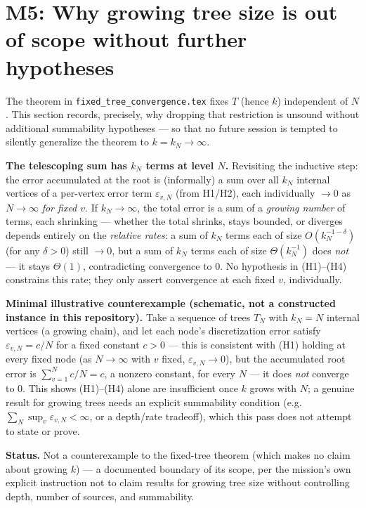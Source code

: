\section*{M5: Why growing tree size is out of scope without further hypotheses}

The theorem in \texttt{fixed\_tree\_convergence.tex} fixes $T$ (hence
$k$) independent of $N$. This section records, precisely, why dropping
that restriction is unsound without additional summability hypotheses —
so that no future session is tempted to silently generalize the theorem
to $k=k_N\to\infty$.

\textbf{The telescoping sum has $k_N$ terms at level $N$.} Revisiting the
inductive step: the error accumulated at the root is (informally) a sum
over all $k_N$ internal vertices of a per-vertex error term
$\varepsilon_{v,N}$ (from H1/H2), each individually $\to 0$ as $N\to
\infty$ \emph{for fixed $v$}. If $k_N\to\infty$, the total error is a sum
of a \emph{growing number} of terms, each shrinking — whether the total
shrinks, stays bounded, or diverges depends entirely on the
\emph{relative rates}: a sum of $k_N$ terms each of size
$O(k_N^{-1-\delta})$ (for any $\delta>0$) still $\to 0$, but a sum of
$k_N$ terms each of size $\Theta(k_N^{-1})$ does \emph{not} — it stays
$\Theta(1)$, contradicting convergence to $0$. No hypothesis in
(H1)–(H4) constrains this rate; they only assert convergence at each
fixed $v$, individually.

\textbf{Minimal illustrative counterexample (schematic, not a
constructed instance in this repository).} Take a sequence of trees
$T_N$ with $k_N=N$ internal vertices (a growing chain), and let each
node's discretization error satisfy $\varepsilon_{v,N} = c/N$ for a fixed
constant $c>0$ — this is consistent with (H1) holding at every fixed
node (as $N\to\infty$ with $v$ fixed, $\varepsilon_{v,N}\to0$), but the
accumulated root error is $\sum_{v=1}^{N} c/N = c$, a nonzero constant,
for every $N$ — it does \emph{not} converge to $0$. This shows (H1)–(H4)
alone are insufficient once $k$ grows with $N$; a genuine result for
growing trees needs an explicit summability condition (e.g.\
$\sum_N \sup_v \varepsilon_{v,N} < \infty$, or a depth/rate tradeoff),
which this pass does not attempt to state or prove.

\textbf{Status.} Not a counterexample to the fixed-tree theorem (which
makes no claim about growing $k$) — a documented boundary of its scope,
per the mission's own explicit instruction not to claim results for
growing tree size without controlling depth, number of sources, and
summability.
